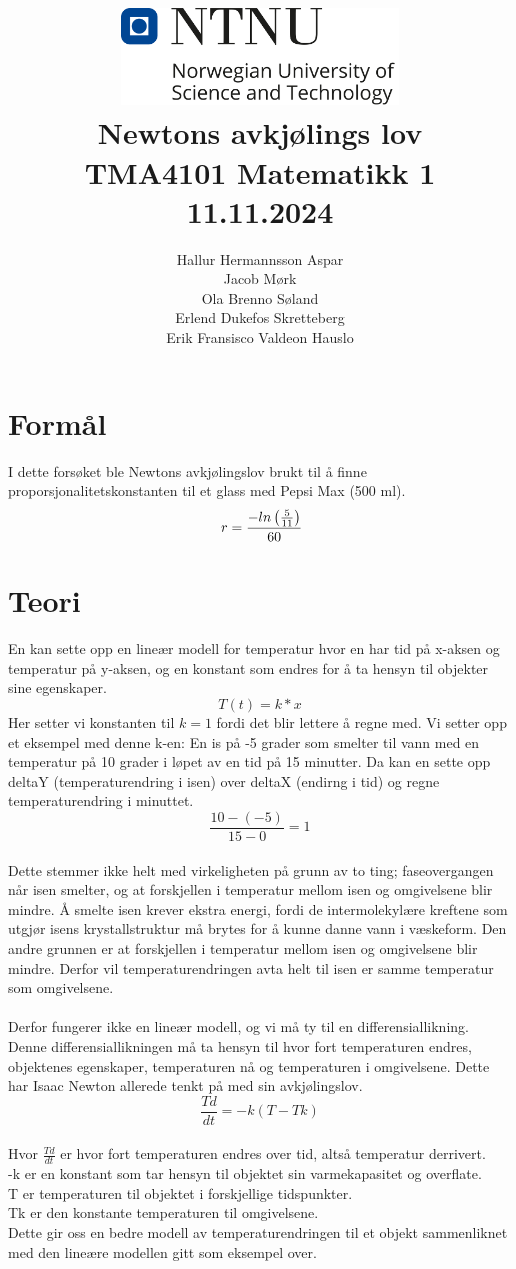 \documentclass[a4paper,12pt]{article}
\title{
    \vspace{2cm} %
    \includegraphics[width=0.55\textwidth]{ntnu_hoeyde_eng.png} \\ %
    \vspace{1cm} %
    \textbf{\Huge Newtons avkjølings lov} \\
    \vspace{1cm} %
    \large TMA4101 Matematikk 1 \\
    \vspace{0.5cm} %
    \large 11.11.2024
}
\author{Hallur Hermannsson Aspar \\ Jacob Mørk \\ Ola Brenno Søland \\ Erlend Dukefos Skretteberg \\ Erik Fransisco Valdeon Hauslo}
\date{}
\begin{document}
\maketitle
\thispagestyle{empty}
\newpage

\setcounter{page}{1}  %
\tableofcontents
\newpage

\section{Formål}
I dette forsøket ble Newtons avkjølingslov brukt til å finne
proporsjonalitetskonstanten til et glass med Pepsi Max (500 ml). \\
\[\ r = \frac{\--ln\left(\frac{5}{11}\right)}{60} \]


\section{Teori}
En kan sette opp en lineær modell for temperatur hvor en har tid på x-aksen og temperatur på y-aksen, og en konstant som endres for å ta hensyn til objekter sine egenskaper. 
\[T(t)=k*x\] 
Her setter vi konstanten til \(k=1\) fordi det blir lettere å regne med. Vi setter opp et eksempel med denne k-en: 
En is på -5 grader som smelter til vann med en temperatur på 10 grader i løpet av en tid på 15 minutter. Da kan en sette opp deltaY (temperaturendring i isen) over deltaX (endirng i tid) og regne temperaturendring i minuttet. 
\[\frac{10-(-5)}{15-0}=1\]\quad \\ 
Dette stemmer ikke helt med virkeligheten på grunn av to ting;  faseovergangen når isen smelter, og at forskjellen i temperatur mellom isen og omgivelsene blir mindre. Å smelte isen krever ekstra energi, fordi de intermolekylære kreftene som utgjør isens krystallstruktur må brytes for å kunne danne vann i væskeform. Den andre grunnen er at forskjellen i temperatur mellom isen og omgivelsene blir mindre. Derfor vil temperaturendringen avta helt til isen er samme temperatur som omgivelsene. \\
\\
Derfor fungerer ikke en lineær modell, og vi må ty til en differensiallikning. Denne differensiallikningen må ta hensyn til hvor fort temperaturen endres, objektenes egenskaper, temperaturen nå og temperaturen i omgivelsene. Dette har Isaac Newton allerede tenkt på med sin avkjølingslov.
\[\frac{Td}{dt}=-k(T-Tk)\]\quad \\
Hvor \(\frac{Td}{dt}\) er hvor fort temperaturen endres over tid, altså temperatur derrivert.\\
-k er en konstant som tar hensyn til objektet sin varmekapasitet og overflate.\\
T er temperaturen til objektet i forskjellige tidspunkter.\\ Tk er den konstante temperaturen til omgivelsene.\\
Dette gir oss en bedre modell av temperaturendringen til et objekt sammenliknet med den lineære modellen gitt som eksempel over.
\end{document}
